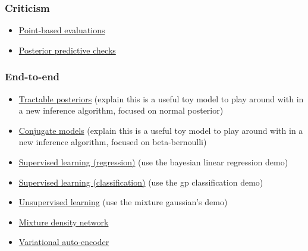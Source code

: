 \subsubsection{Criticism}

\begin{itemize}
  \item \href{tut_point_eval.html}{Point-based evaluations}
  \item \href{tut_PPC.html}{Posterior predictive checks}
\end{itemize}

\subsubsection{End-to-end}

\begin{itemize}
  \item \href{#}{Tractable posteriors} (explain this is a useful toy model to play
    around with in a new inference algorithm, focused on normal
    posterior)
  \item \href{#}{Conjugate models} (explain this is a useful toy model to play
    around with in a new inference algorithm, focused on
    beta-bernoulli)
  \item \href{#}{Supervised learning (regression)} (use the bayesian linear regression demo)
  \item \href{#}{Supervised learning (classification)} (use the gp classification demo)
  \item \href{#}{Unsupervised learning} (use the mixture gaussian's demo)
  \item \href{#}{Mixture density network}
  \item \href{#}{Variational auto-encoder}
\end{itemize}
